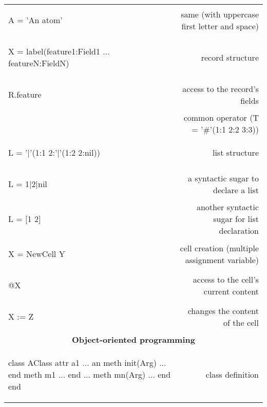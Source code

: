 \documentclass[12pt]{article}
\begin{document}
\begin{longtable}{l r}
\begin{oz}
A = 'An atom'
\end{oz}
& same (with uppercase first letter and space)\\



\begin{oz}
X = label(feature1:Field1 
		... 
	  featureN:FieldN)
\end{oz}
&record structure \\

\begin{oz}
R.feature
\end{oz}
&access to the record's fields\\

\begin{oz}
T = 1#2#3
\end{oz}
& common operator (T = '\#'(1:1 2:2 3:3))\\

\begin{oz}
L = '|'(1:1 2:'|'(1:2 2:nil))
\end{oz}
& list structure\\

\begin{oz}
L = 1|2|nil
\end{oz}
& a syntactic sugar to declare a list\\

\begin{oz}
L = [1 2]
\end{oz}
& another syntactic sugar for list declaration\\

\begin{oz}
X = {NewCell Y}
\end{oz}
&cell creation (multiple assignment variable) \\

\begin{oz}
@X
\end{oz}
& access to the cell's current content\\

\begin{oz}
X := Z
\end{oz}
&changes the content of the cell \\[0.4em]

\multicolumn{2}{c}{\textbf{Object-oriented programming}}\\

\begin{oz}
class AClass
	attr a1 ... an
	meth init(Arg) ... end
	meth m1 ... end
		...
	meth mn(Arg) ... end
end
\end{oz}
&class definition\\


\end{longtable}
\end{document}
